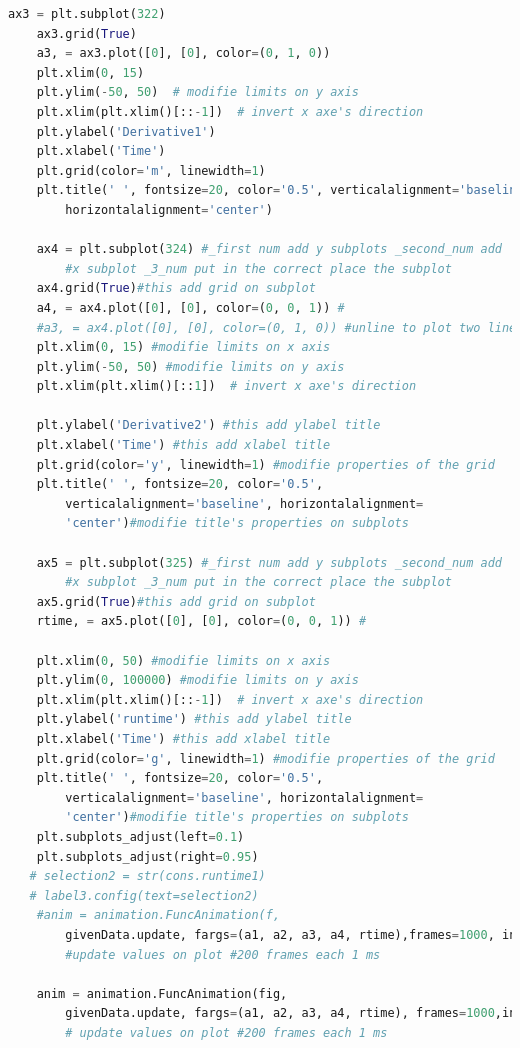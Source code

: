 {\begin{lstlisting}[language=python]
    ax3 = plt.subplot(322)
    ax3.grid(True)
    a3, = ax3.plot([0], [0], color=(0, 1, 0))
    plt.xlim(0, 15)
    plt.ylim(-50, 50)  # modifie limits on y axis
    plt.xlim(plt.xlim()[::-1])  # invert x axe's direction
    plt.ylabel('Derivative1')
    plt.xlabel('Time')
    plt.grid(color='m', linewidth=1)
    plt.title(' ', fontsize=20, color='0.5', verticalalignment='baseline', 
		horizontalalignment='center')

    ax4 = plt.subplot(324) #_first num add y subplots _second_num add
		#x subplot _3_num put in the correct place the subplot
    ax4.grid(True)#this add grid on subplot
    a4, = ax4.plot([0], [0], color=(0, 0, 1)) #
    #a3, = ax4.plot([0], [0], color=(0, 1, 0)) #unline to plot two lines in the same plot
    plt.xlim(0, 15) #modifie limits on x axis
    plt.ylim(-50, 50) #modifie limits on y axis
    plt.xlim(plt.xlim()[::1])  # invert x axe's direction

    plt.ylabel('Derivative2') #this add ylabel title
    plt.xlabel('Time') #this add xlabel title
    plt.grid(color='y', linewidth=1) #modifie properties of the grid
    plt.title(' ', fontsize=20, color='0.5', 
		verticalalignment='baseline', horizontalalignment=
		'center')#modifie title's properties on subplots

    ax5 = plt.subplot(325) #_first num add y subplots _second_num add 
		#x subplot _3_num put in the correct place the subplot
    ax5.grid(True)#this add grid on subplot
    rtime, = ax5.plot([0], [0], color=(0, 0, 1)) #

    plt.xlim(0, 50) #modifie limits on x axis
    plt.ylim(0, 100000) #modifie limits on y axis
    plt.xlim(plt.xlim()[::-1])  # invert x axe's direction
    plt.ylabel('runtime') #this add ylabel title
    plt.xlabel('Time') #this add xlabel title
    plt.grid(color='g', linewidth=1) #modifie properties of the grid
    plt.title(' ', fontsize=20, color='0.5',
		verticalalignment='baseline', horizontalalignment=
		'center')#modifie title's properties on subplots
    plt.subplots_adjust(left=0.1)
    plt.subplots_adjust(right=0.95)
   # selection2 = str(cons.runtime1)
   # label3.config(text=selection2)
    #anim = animation.FuncAnimation(f, 
		givenData.update, fargs=(a1, a2, a3, a4, rtime),frames=1000, interval=1) 
		#update values on plot #200 frames each 1 ms

    anim = animation.FuncAnimation(fig,
		givenData.update, fargs=(a1, a2, a3, a4, rtime), frames=1000,interval=1)  
		# update values on plot #200 frames each 1 ms


\end{lstlisting}}
